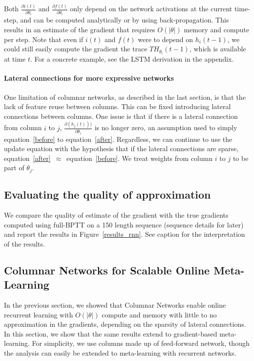 \documentclass{article}
\begin{document}
Both $\frac{\partial i(t)}{\partial \theta_i}$ and $\frac{\partial f(t)}{\partial \theta_i}$ only depend on the network activations at the current time-step, and can be computed analytically or by using back-propagation. This results in an estimate of the gradient that requires $O(|\theta|)$ memory and compute per step. Note that even if $i(t)$ and $f(t)$ were to depend on $h_i(t-1)$, we could still easily compute the gradient the trace $ TH_{\theta_i}(t-1)$, which is available at time $t$. For a concrete example, see the LSTM derivation in the appendix. 

\paragraph{Lateral connections for more expressive networks}
One limitation of columnar networks, as described in the last section, is that the lack of feature reuse between columns. This can be fixed introducing lateral connections between columns. One issue is that if there is a lateral connection from column $i$ to $j$, $\frac{\partial ( h_j(t)))}{ \partial \theta_i}$ is no longer zero, an assumption used to simply equation~\ref{before} to equation~\ref{after}. Regardless, we can continue to use the update equation with the hypothesis that if the lateral connections are sparse, equation~\ref{after}~$\approx$~equation~\ref{before}. We treat weights from column $i$ to $j$ to be part of $\theta_j$.
\subsection{Evaluating the quality of approximation}
We compare the quality of estimate of the gradient with the true gradients computed using full-BPTT on a 150 length sequence (sequence details for later) and report the results in Figure~\ref{results_rnn}. See caption for the interpretation of the results. 
\subsection{Columnar Networks for Scalable Online Meta-Learning}
In the previous section, we showed that Columnar Networks enable online recurrent learning with $O(|\theta|)$ compute and memory with little to no approximation in the gradients, depending on the sparsity of lateral connections. In this section, we show that the same results extend to gradient-based meta-learning. For simplicity, we use columns made up of feed-forward network, though the analysis can easily be extended to meta-learning with recurrent networks. 
\end{document}
